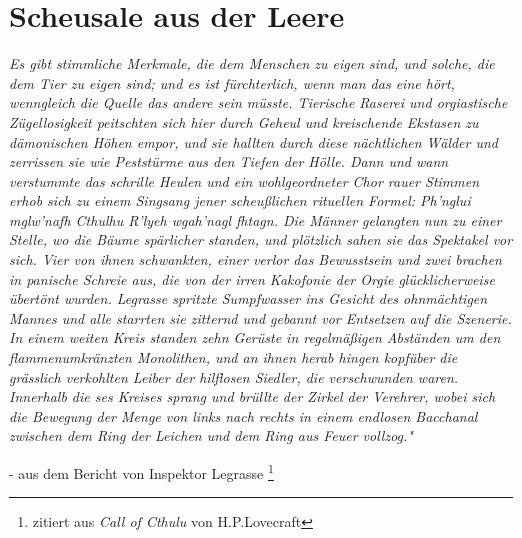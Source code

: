 \documentclass[10pt,twoside,twocolumn,openany]{book}
\begin{document}
\section{Scheusale aus der Leere}
\begin{quotebox}
	\textit{
		Es gibt	stimmliche  Merkmale,  die  dem  Menschen  zu  eigen  sind,  und solche,  die  dem  Tier  zu  eigen  sind;  und  es  ist  fürchterlich,		wenn  man  das  eine  hört,  wenngleich  die  Quelle  das  andere sein  müsste.  Tierische  Raserei  und orgiastische  Zügellosigkeit	peitschten  sich  hier  durch  Geheul  und  kreischende  Ekstasen		zu  dämonischen  Höhen  empor,  und  sie  hallten  durch  diese		nächtlichen  Wälder  und  zerrissen  sie  wie  Peststürme  aus  den
		Tiefen  der  Hölle.  Dann  und  wann  verstummte  das  schrille	Heulen  und  ein  wohlgeordneter  Chor  rauer  Stimmen  erhob		sich  zu  einem  Singsang  jener  scheußlichen  rituellen  Formel:
		\emph{Ph’nglui mglw’nafh Cthulhu R’lyeh wgah’nagl fhtagn.}
		Die  Männer  gelangten  nun  zu  einer  Stelle,  wo  die  Bäume		spärlicher  standen,  und  plötzlich  sahen  sie  das  Spektakel  vor		sich. Vier von ihnen schwankten, einer verlor das Bewusstsein		und  zwei  brachen  in  panische  Schreie  aus,  die  von  der  irren	Kakofonie der Orgie glücklicherweise übertönt wurden. 
		Legrasse spritzte Sumpfwasser ins Gesicht des ohnmächtigen
		Mannes  und  alle  starrten  sie  zitternd  und  gebannt  vor  Entsetzen  auf  die  Szenerie. 
		In  einem  weiten  Kreis  standen  zehn  Gerüste  in  regelmäßigen
		Abständen  um  den  flammenumkränzten  Monolithen,  und  an
		ihnen  herab  hingen  kopfüber  die  grässlich  verkohlten  Leiber
		der  hilflosen  Siedler,  die  verschwunden  waren.  Innerhalb  die	ses  Kreises  sprang  und  brüllte  der  Zirkel  der  Verehrer,  wobei
		sich die Bewegung der Menge von links nach rechts in einem
		endlosen Bacchanal zwischen dem Ring der Leichen und dem
		Ring aus Feuer vollzog."}
	\begin{flushright}
		- aus dem Bericht von Inspektor Legrasse \footnote{zitiert aus \emph{Call of Cthulu} von H.P.Lovecraft}
	\end{flushright}
\end{quotebox}
\end{document}
